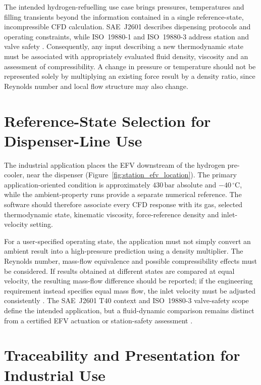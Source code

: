 The intended hydrogen-refuelling use case brings pressures, temperatures and filling transients beyond the information contained in a single reference-state, incompressible CFD calculation. SAE~J2601 describes dispensing protocols and operating constraints, while ISO~19880-1 and ISO~19880-3 address station and valve safety \cite{sae_j2601,iso19880_1,iso19880_3}. Consequently, any input describing a new thermodynamic state must be associated with appropriately evaluated fluid density, viscosity and an assessment of compressibility. A change in pressure or temperature should not be represented solely by multiplying an existing force result by a density ratio, since Reynolds number and local flow structure may also change.

\section{Reference-State Selection for Dispenser-Line Use}
\label{sec:tool_430bar}

The industrial application places the EFV downstream of the hydrogen pre-cooler, near the dispenser (Figure~\ref{fig:station_efv_location}). The primary application-oriented condition is approximately $430\,\mathrm{bar}$ absolute and $-40\,^{\circ}\mathrm{C}$, while the ambient-property runs provide a separate numerical reference. The software should therefore associate every CFD response with its gas, selected thermodynamic state, kinematic viscosity, force-reference density and inlet-velocity setting.

For a user-specified operating state, the application must not simply convert an ambient result into a high-pressure prediction using a density multiplier. The Reynolds number, mass-flow equivalence and possible compressibility effects must be considered. If results obtained at different states are compared at equal velocity, the resulting mass-flow difference should be reported; if the engineering requirement instead specifies equal mass flow, the inlet velocity must be adjusted consistently \cite{white2016,nist_refprop_online}. The SAE~J2601 T40 context and ISO~19880-3 valve-safety scope define the intended application, but a fluid-dynamic comparison remains distinct from a certified EFV actuation or station-safety assessment \cite{sae_j2601,iso19880_3}.

\section{Traceability and Presentation for Industrial Use}
\label{sec:industrial_traceability}


